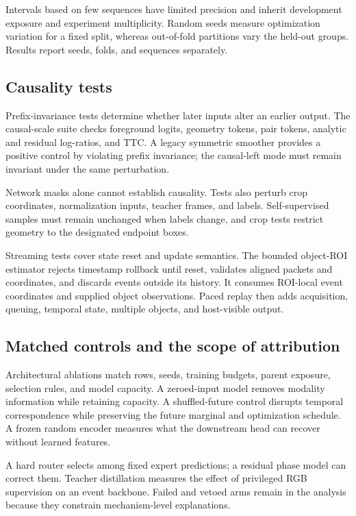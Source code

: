 Intervals based on few sequences have limited precision and inherit development exposure and experiment multiplicity. Random seeds measure optimization variation for a fixed split, whereas out-of-fold partitions vary the held-out groups. Results report seeds, folds, and sequences separately.

\subsection{Causality tests}
Prefix-invariance tests determine whether later inputs alter an earlier output. The causal-scale suite checks foreground logits, geometry tokens, pair tokens, analytic and residual log-ratios, and TTC. A legacy symmetric smoother provides a positive control by violating prefix invariance; the causal-left mode must remain invariant under the same perturbation. 

Network masks alone cannot establish causality. Tests also perturb crop coordinates, normalization inputs, teacher frames, and labels. Self-supervised samples must remain unchanged when labels change, and crop tests restrict geometry to the designated endpoint boxes. 

Streaming tests cover state reset and update semantics. The bounded object-ROI estimator rejects timestamp rollback until reset, validates aligned packets and coordinates, and discards events outside its history. It consumes ROI-local event coordinates and supplied object observations. Paced replay then adds acquisition, queuing, temporal state, multiple objects, and host-visible output. 

\subsection{Matched controls and the scope of attribution}
Architectural ablations match rows, seeds, training budgets, parent exposure, selection rules, and model capacity. A zeroed-input model removes modality information while retaining capacity. A shuffled-future control disrupts temporal correspondence while preserving the future marginal and optimization schedule. A frozen random encoder measures what the downstream head can recover without learned features.

A hard router selects among fixed expert predictions; a residual phase model can correct them. Teacher distillation measures the effect of privileged RGB supervision on an event backbone. Failed and vetoed arms remain in the analysis because they constrain mechanism-level explanations.

